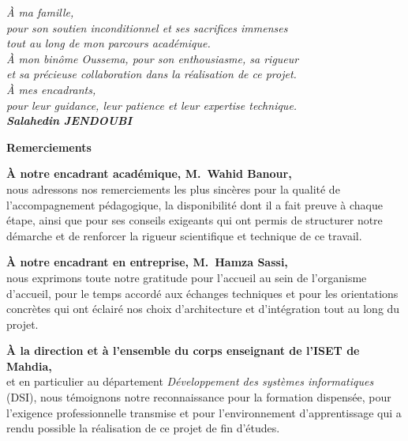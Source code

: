 \documentclass[a4paper,12pt]{report}
\begin{document}
	\begin{flushright}
		\itshape
		À ma famille,\\
		pour son soutien inconditionnel et ses sacrifices immenses\\
		tout au long de mon parcours académique.\\[0.5cm]
		
		À mon binôme Oussema, pour son enthousiasme, sa rigueur\\
		et sa précieuse collaboration dans la réalisation de ce projet.\\[0.5cm]
		
		À mes encadrants,\\
		pour leur guidance, leur patience et leur expertise technique.\\[0.5cm]
		
		\textbf{\Large Salahedin JENDOUBI}
	\end{flushright}
	
	\vspace*{\fill}
	
	\clearpage
	\thispagestyle{preStyle}
	\begin{center}
		{\fontsize{16}{20}\selectfont\bfseries Remerciements}
	\end{center}
	\vspace{1em}
	
	\begingroup
	\setlength{\parindent}{0pt}
	\setlength{\parskip}{0.9em}
	
	\textbf{À notre encadrant académique, M.~Wahid Banour,}\\
	nous adressons nos remerciements les plus sincères pour la qualité de l'accompagnement
	pédagogique, la disponibilité dont il a fait preuve à chaque étape, ainsi que pour ses
	conseils exigeants qui ont permis de structurer notre démarche et de renforcer la
	rigueur scientifique et technique de ce travail.
	
	\textbf{À notre encadrant en entreprise, M.~Hamza Sassi,}\\
	nous exprimons toute notre gratitude pour l'accueil au sein de l'organisme d'accueil,
	pour le temps accordé aux échanges techniques et pour les orientations concrètes qui
	ont éclairé nos choix d'architecture et d'intégration tout au long du projet.
	
	\textbf{À la direction et à l'ensemble du corps enseignant de l'ISET de Mahdia,}\\
	et en particulier au département \textit{Développement des systèmes informatiques} (DSI),
	nous témoignons notre reconnaissance pour la formation dispensée, pour l'exigence
	professionnelle transmise et pour l'environnement d'apprentissage qui a rendu possible
	la réalisation de ce projet de fin d'études.
	
\end{document}
